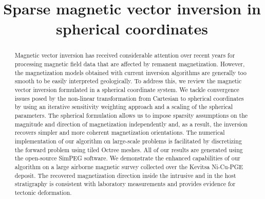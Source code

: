 \documentclass[paper]{geophysics}
\begin{document}
\title{Sparse magnetic vector inversion in spherical coordinates}

% 
% 
% 
% 
% 



\begin{abstract}
Magnetic vector inversion has received considerable attention over recent years for processing magnetic field data that are affected by remanent magnetization. However, the magnetization models obtained with current inversion algorithms are generally too smooth to be easily interpreted geologically. To address this, we review the magnetic vector inversion formulated in a spherical coordinate system. We tackle convergence issues posed by the non-linear transformation from Cartesian to spherical coordinates by using an iterative sensitivity weighting approach and a scaling of the spherical parameters. The spherical formulation allows us to impose sparsity assumptions on the magnitude and direction of magnetization independently and, as a result, the inversion recovers simpler and more coherent magnetization orientations. The numerical implementation of our algorithm on large-scale problems is facilitated by discretizing the forward problem using tiled Octree meshes. All of our results are generated using the open-source SimPEG software. We demonstrate the enhanced capabilities of our algorithm on a large airborne magnetic survey collected over the Kevitsa Ni-Cu-PGE deposit. The recovered magnetization direction inside the intrusive and in the host stratigraphy is consistent with laboratory measurements and provides evidence for tectonic deformation.
\end{abstract}
\end{document}
